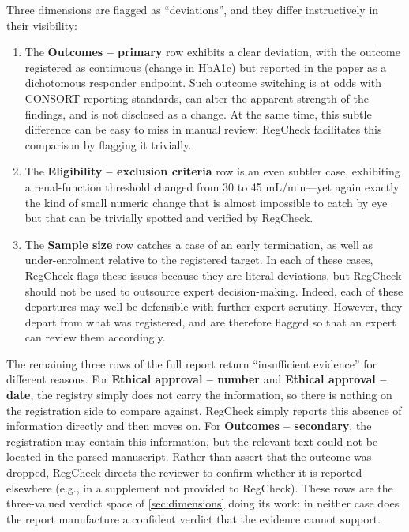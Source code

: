 \documentclass{article}
\begin{document}
Three dimensions are flagged as ``deviations'', and they differ instructively in
their visibility:
\begin{enumerate}
  \item The \textbf{Outcomes -- primary} row exhibits a clear deviation, with
  the outcome registered as continuous (change in HbA1c) but reported in the
  paper as a dichotomous responder endpoint. Such outcome switching is at odds
  with CONSORT reporting standards, can alter the apparent strength of the
  findings, and is not disclosed as a change. At the same time, this subtle
  difference can be easy to miss in manual review: RegCheck facilitates this
  comparison by flagging it trivially.
  \item The \textbf{Eligibility -- exclusion criteria} row is an even subtler
  case, exhibiting a renal-function threshold changed from 30 to 45
  mL/min---yet again exactly the kind of small numeric change that is almost
  impossible to catch by eye but that can be trivially spotted and verified by
  RegCheck.
  \item The \textbf{Sample size} row catches a case of an early termination, as
  well as under-enrolment relative to the registered target. In each of these
  cases, RegCheck flags these issues because they are literal deviations, but
  RegCheck should not be used to outsource expert decision-making. Indeed, each
  of these departures may well be defensible with further expert scrutiny.
  However, they depart from what was registered, and are therefore flagged so
  that an expert can review them accordingly.
\end{enumerate}

The remaining three rows of the full report return ``insufficient evidence''
for different reasons. For \textbf{Ethical approval -- number} and
\textbf{Ethical approval -- date}, the registry simply does not carry the
information, so there is nothing on the registration side to compare against.
RegCheck simply reports this absence of information directly and then moves on.
For \textbf{Outcomes -- secondary}, the registration may contain this
information, but the relevant text could not be located in the parsed
manuscript. Rather than assert that the outcome was dropped, RegCheck directs
the reviewer to confirm whether it is reported elsewhere (e.g., in a supplement
not provided to RegCheck). These rows are the three-valued verdict space of
\cref{sec:dimensions} doing its work: in neither case does the report
manufacture a confident verdict that the evidence cannot support.
\end{document}
